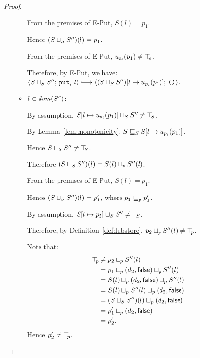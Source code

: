 \begin{proof}
\begin{itemize}
\begin{itemize}
          From the premises of {\sc E-Put}, $S(l) = p_1$.

          Hence $(S \sqcup_{S} S'')(l) = p_1$.

          From the premises of {\sc E-Put}, $u_{p_i}(p_1) \neq \top\hspace{-0.85mm}_{p}$.

          Therefore, by {\sc E-Put}, we have:
          $\config{\lubstore{S}{S''}}{\putiexp{l}} \parstepsto
          \config{\extSRaw{(\lubstore{S}{S''})}{l}{u_{p_i}(p_1)}}{\unit}$.

        \item $l \in \mathit{dom}(S'')$:

          By assumption, $S[l \mapsto u_{p_i}(p_1)] \sqcup_{S} S'' \neq
          \top\hspace{-0.85mm}_{S}$.

          By Lemma~\ref{lem:monotonicity},
          $S \sqsubseteq_S S[l \mapsto u_{p_i}(p_1)]$.

          Hence $S \sqcup_{S} S'' \neq \top\hspace{-0.85mm}_{S}$.

          Therefore $(S \sqcup_{S} S'')(l) = S(l) \sqcup_p S''(l)$.

          From the premises of {\sc E-Put}, $S(l) = p_1$.
          
          Hence $(S \sqcup_{S} S'')(l) = p'_1$, where $p_1 \sqsubseteq_p
          p'_1$.


          By assumption, $S[l \mapsto p_2] \sqcup_{S} S'' \neq
          \top\hspace{-0.85mm}_{S}$.

          Therefore, by Definition~\ref{def:lubstore},
          $p_2 \sqcup_p S''(l) \neq \top\hspace{-0.85mm}_{p}$.

          Note that:
          \begin{align*}
            \top\hspace{-0.85mm}_{p} &\neq p_2 \sqcup_p S''(l) \\
            &= p_1 \sqcup_p (d_2, \textsf{false}) \sqcup_p S''(l) \\
            &= S(l) \sqcup_p (d_2, \textsf{false}) \sqcup_p S''(l) \\
            &= S(l) \sqcup_p S''(l) \sqcup_p (d_2, \textsf{false}) \\
            &= (S \sqcup_{S} S'')(l) \sqcup_p (d_2, \textsf{false}) \\
            &= p'_1 \sqcup_p (d_2, \textsf{false}) \\
            &= p'_2. \\
          \end{align*}
          Hence $p'_2 \neq \top\hspace{-0.85mm}_{p}$.


\end{itemize}
\end{itemize}
\end{proof}
